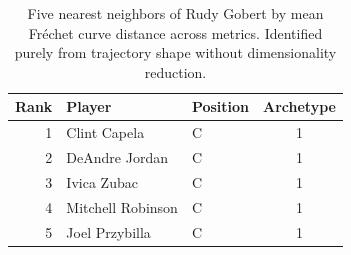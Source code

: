 \begin{table}[htbp]
  \centering\small
  \begin{tabular}{rllc}
    \toprule
    Rank & Player & Position & Archetype \\
    \midrule
    1 & Clint Capela & C & 1 \\
    2 & DeAndre Jordan & C & 1 \\
    3 & Ivica Zubac & C & 1 \\
    4 & Mitchell Robinson & C & 1 \\
    5 & Joel Przybilla & C & 1 \\
    \bottomrule
  \end{tabular}
  \caption{Five nearest neighbors of Rudy Gobert by mean Fr\'{e}chet curve distance across metrics. Identified purely from trajectory shape without dimensionality reduction.}
  \label{tab:Rudy_Gobert_frechet_curve_neighbors}
\end{table}

